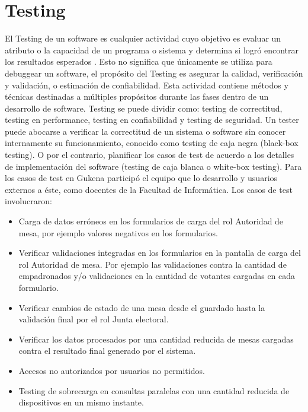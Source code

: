 \section{Testing}
El Testing de un software es cualquier actividad cuyo objetivo es evaluar un atributo o la capacidad de un programa o sistema y determina si logró encontrar los resultados esperados \cite{pan1999software}. Esto no significa que únicamente se utiliza para debuggear un software, el propósito del Testing es asegurar la calidad, verificación y validación, o estimación de confiabilidad. Esta actividad contiene métodos y técnicas destinadas a múltiples propósitos durante las fases dentro de un desarrollo de software. Testing se puede dividir como: testing de correctitud, testing en performance, testing en confiabilidad y testing de seguridad. Un tester puede abocarse a verificar la correctitud de un sistema o software sin conocer internamente su funcionamiento, conocido como testing de caja negra (black-box testing). O por el contrario, planificar los casos de test de acuerdo a los detalles de implementación del software (testing de caja blanca o white-box testing). \newline
Para los casos de test en Gukena participó el equipo que lo desarrollo y usuarios externos a éste, como docentes de la Facultad de Informática. Los casos de test involucraron:
\begin{itemize}
    \item Carga de datos erróneos en los formularios de carga del rol Autoridad de mesa, por ejemplo valores negativos en los formularios.
    \item Verificar validaciones integradas en los formularios en la pantalla de carga del rol Autoridad de mesa. Por ejemplo las validaciones contra la cantidad de empadronados y/o validaciones en la cantidad de votantes cargadas en cada formulario.
    \item Verificar cambios de estado de una mesa desde el guardado hasta la validación final por el rol Junta electoral.
    \item Verificar los datos procesados por una cantidad reducida de mesas cargadas contra el resultado final generado por el sistema.
    \item Accesos no autorizados por usuarios no permitidos.
    \item Testing de sobrecarga en consultas paralelas con una cantidad reducida de dispositivos en un mismo instante.
\end{itemize}

